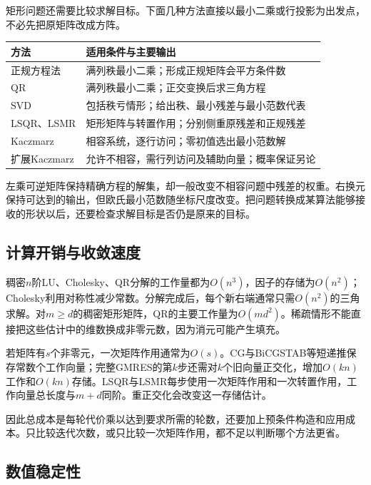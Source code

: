 矩形问题还需要比较求解目标。下面几种方法直接以最小二乘或行投影为出发点，不必先把原矩阵改成方阵。

\begin{center}
\small
\begin{tabular}{p{}p{}}
\toprule
方法 & 适用条件与主要输出\\
\midrule
正规方程法 & 满列秩最小二乘；形成正规矩阵会平方条件数\\
QR & 满列秩最小二乘；正交变换后求三角方程\\
SVD & 包括秩亏情形；给出秩、最小残差与最小范数代表\\
LSQR、LSMR & 矩形矩阵与转置作用；分别侧重原残差和正规残差\\
Kaczmarz & 相容系统，逐行访问；零初值选出最小范数解\\
扩展Kaczmarz & 允许不相容，需行列访问及辅助向量；概率保证另论\\
\bottomrule
\end{tabular}
\end{center}

左乘可逆矩阵保持精确方程的解集，却一般改变不相容问题中残差的权重。右换元保持可达到的输出，但欧氏最小范数随坐标尺度改变。把问题转换成某算法能够接收的形状以后，还要检查求解目标是否仍是原来的目标。

\subsection{计算开销与收敛速度}

稠密$n$阶LU、Cholesky、QR分解的工作量都为$O(n^3)$，因子的存储为$O(n^2)$；Cholesky利用对称性减少常数。分解完成后，每个新右端通常只需$O(n^2)$的三角求解。对$m\ge d$的稠密矩形矩阵，QR的主要工作量为$O(md^2)$。稀疏情形不能直接把这些估计中的维数换成非零元数，因为消元可能产生填充。

若矩阵有$s$个非零元，一次矩阵作用通常为$O(s)$。CG与BiCGSTAB等短递推保存常数个工作向量；完整GMRES的第$k$步还需对$k$个旧向量正交化，增加$O(kn)$工作和$O(kn)$存储。LSQR与LSMR每步使用一次矩阵作用和一次转置作用，工作向量总长度与$m+d$同阶。重正交化会改变这一存储估计。

因此总成本是每轮代价乘以达到要求所需的轮数，还要加上预条件构造和应用成本。只比较迭代次数，或只比较一次矩阵作用，都不足以判断哪个方法更省。

\subsection{数值稳定性}

